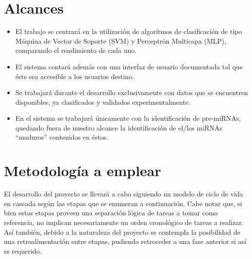 \documentclass[12pt,bibliography=oldstyle,DIV=12,parskip=full-]{scrartcl}
\begin{document}
\section{Alcances}
\begin{itemize}
\item El trabajo se centrará en la utilización de algoritmos de
  clasificación de tipo Máquina de Vector de Soporte (SVM) y Perceptrón
  Multicapa (MLP), comparando el rendimiento de cada uno.
\item El sistema contará además con una interfaz de usuario
  documentada tal que éste sea accesible a los usuarios destino.
\item Se trabajará durante el desarrollo exclusivamente con datos que
  se encuentren disponibles, ya clasificados y validados
  experimentalmente.
\item En el sistema se trabajará únicamente con la identificación de
  pre-miRNAs, quedando fuera de nuestro alcance la identificación de
  el/los miRNAs “maduros” contenidos en éstos.
\end{itemize}
%
%
\section{Metodología a emplear}
El desarrollo del proyecto se llevará a cabo siguiendo un modelo de
ciclo de vida en cascada según las etapas que se enumeran a
continuación.  Cabe notar que, si bien estas etapas proveen una
separación lógica de tareas a tomar como referencia, no implican
necesariamente un orden cronológico de tareas a realizar. Así también,
debido a la naturaleza del proyecto se contempla la posibilidad de una
retroalimentación entre etapas, pudiendo retroceder a una fase
anterior si así es requerido.
%
\end{document}
